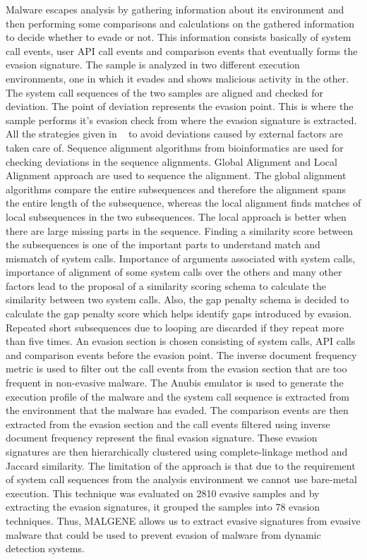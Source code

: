 \documentclass[11pt]{article}
\begin{document}
		Malware escapes analysis by gathering information about its environment and then performing some comparisons and calculations on the gathered information to decide whether to evade or not. This information consists basically of system call events, user API call events and comparison events that eventually forms the evasion signature. The sample is analyzed in two different execution environments, one in which it evades and shows malicious activity in the other. The system call sequences of the two samples are aligned and checked for deviation. The point of deviation represents the evasion point. This is where the sample performs it’s evasion check from where the evasion signature is extracted. All the strategies given in ~\cite{kirat2014barecloud} to avoid deviations caused by external factors are taken care of. Sequence alignment algorithms from bioinformatics are used for checking deviations in the sequence alignments. Global Alignment and Local Alignment approach are used to sequence the alignment. The global alignment algorithms compare the entire subsequences and therefore the alignment spans the entire length of the subsequence, whereas the local alignment finds matches of local subsequences in the two subsequences. The local approach is better when there are large missing parts in the sequence. Finding a similarity score between the subsequences is one of the important parts to understand match and mismatch of system calls. Importance of arguments associated with system calls, importance of alignment of some system calls over the others and many other factors lead to the proposal of a similarity scoring schema to calculate the similarity between two system calls. Also, the gap penalty schema is decided to calculate the gap penalty score which helps identify gaps introduced by evasion. Repeated short subsequences due to looping are discarded if they repeat more than five times.
		An evasion section is chosen consisting of system calls, API calls and comparison events before the evasion point. The inverse document frequency metric is used to filter out the call events from the evasion section that are too frequent in non-evasive malware. The Anubis emulator is used to generate the execution profile of the malware and the system call sequence is extracted from the environment that the malware has evaded. The comparison events are then extracted from the evasion section and the call events filtered using inverse document frequency represent the final evasion signature. These evasion signatures are then hierarchically clustered using complete-linkage method and Jaccard similarity.
		The limitation of the approach is that due to the requirement of system call sequences from the analysis environment we cannot use bare-metal execution. This technique was evaluated on 2810 evasive samples and by extracting the evasion signatures, it grouped the samples into 78 evasion techniques. Thus, MALGENE allows us to extract evasive signatures from evasive malware that could be used to prevent evasion of malware from dynamic detection systems.
		
\end{document}
